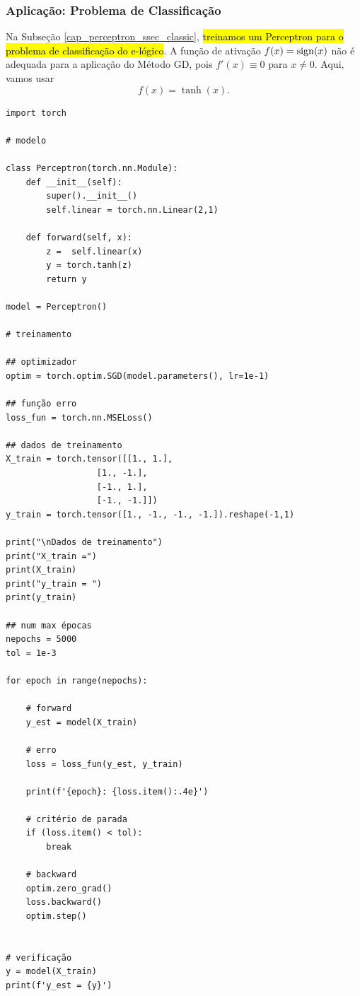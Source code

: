 \subsubsection{Aplicação: Problema de Classificação}

Na Subseção \ref{cap_perceptron_ssec_classic}, \hl{treinamos um Perceptron para o problema de classificação do e-lógico}. A função de ativação $f(x) = \operatorname{sign}(x)$ não é adequada para a aplicação do Método GD, pois $f'(x) \equiv 0$ para $x\neq 0$. Aqui, vamos usar
\begin{equation}
  f(x) = \tanh(x).
\end{equation}

% 
\begin{lstlisting}[caption=perceptron\_gd.py, label=cap_perceptron_sec_train:cod:perceptron_gd]
import torch

# modelo

class Perceptron(torch.nn.Module):
    def __init__(self):
        super().__init__()
        self.linear = torch.nn.Linear(2,1)

    def forward(self, x):
        z =  self.linear(x)
        y = torch.tanh(z)
        return y

model = Perceptron()

# treinamento

## optimizador
optim = torch.optim.SGD(model.parameters(), lr=1e-1)

## função erro
loss_fun = torch.nn.MSELoss()

## dados de treinamento
X_train = torch.tensor([[1., 1.],
                  [1., -1.],
                  [-1., 1.],
                  [-1., -1.]])
y_train = torch.tensor([1., -1., -1., -1.]).reshape(-1,1)

print("\nDados de treinamento")
print("X_train =")
print(X_train)
print("y_train = ")
print(y_train)

## num max épocas
nepochs = 5000
tol = 1e-3

for epoch in range(nepochs):

    # forward
    y_est = model(X_train)

    # erro
    loss = loss_fun(y_est, y_train)

    print(f'{epoch}: {loss.item():.4e}')

    # critério de parada
    if (loss.item() < tol):
        break

    # backward
    optim.zero_grad()
    loss.backward()
    optim.step()


# verificação
y = model(X_train)
print(f'y_est = {y}')
\end{lstlisting}

